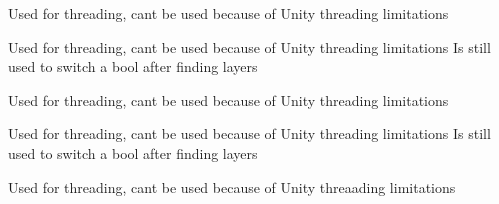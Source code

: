 
\begin{DoxyRefList}
\item[Member \mbox{\hyperlink{class_ray_test_ad28bd35745c6733d3ddf653a317689b2}{Ray\+Test.\+\_\+t1}} ]\label{deprecated__deprecated000001}%
%
Used for threading, can\textquotesingle{}t be used because of Unity threading limitations  
\item[Member \mbox{\hyperlink{class_ray_test_a9804deacbcad84786aad180f9b87a9b7}{Ray\+Test.\+\_\+t1\+Finished}} ]\label{deprecated__deprecated000003}%
%
Used for threading, can\textquotesingle{}t be used because of Unity threading limitations Is still used to switch a bool after finding layers  
\item[Member \mbox{\hyperlink{class_ray_test_a976c1b9bdb2cbe2cee0469222f5372f6}{Ray\+Test.\+\_\+t2}} ]\label{deprecated__deprecated000002}%
%
Used for threading, can\textquotesingle{}t be used because of Unity threading limitations  
\item[Member \mbox{\hyperlink{class_ray_test_a464809a15b8df580eb2a3b877f332dc8}{Ray\+Test.\+\_\+t2\+Finished}} ]\label{deprecated__deprecated000004}%
%
Used for threading, can\textquotesingle{}t be used because of Unity threading limitations Is still used to switch a bool after finding layers  
\item[Member \mbox{\hyperlink{class_ray_test_a71d750d63365afb87d041519908708d8}{Ray\+Test.threading}} ]\label{deprecated__deprecated000005}%
%
Used for threading, can\textquotesingle{}t be used because of Unity threaading limitations 
\end{DoxyRefList}
